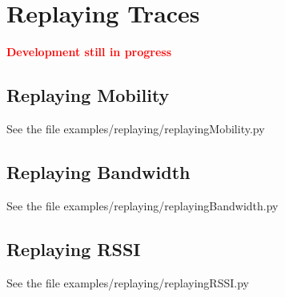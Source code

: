 \chapter{Replaying Traces}
\textbf{\textcolor{red}{Development still in progress}}

\section{Replaying Mobility}
See the file examples/replaying/replayingMobility.py

\section{Replaying Bandwidth}
See the file examples/replaying/replayingBandwidth.py

\section{Replaying RSSI}
See the file examples/replaying/replayingRSSI.py